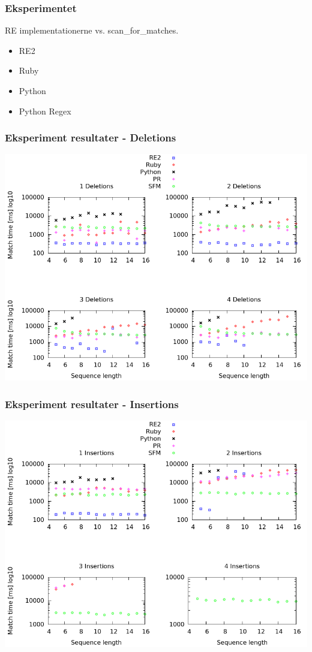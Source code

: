 \documentclass{beamer}
\begin{document}
\begin{frame}
	\frametitle{Eksperimentet}

	RE implementationerne vs. scan\_for\_matches.

	\begin{itemize}
		\item RE2
		\item Ruby
		\item Python
		\item Python Regex
	\end{itemize}
\end{frame}

\begin{frame}
	\frametitle{Eksperiment resultater - Deletions}
	
	\begin{center}
		\includegraphics[scale=0.3]{../rapport/graphs/deletions.png}
	\end{center}
\end{frame}

\begin{frame}
	\frametitle{Eksperiment resultater - Insertions}
	
	\begin{center}
		\includegraphics[scale=0.3]{../rapport/graphs/insertions.png}
	\end{center}
\end{frame}
\end{document}
